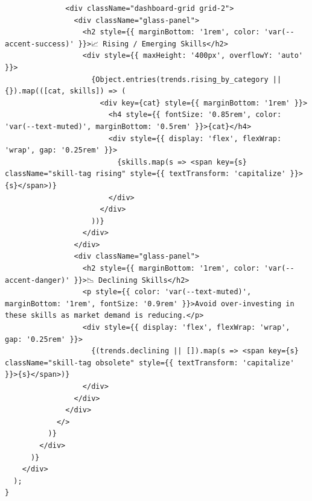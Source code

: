 \documentclass[12pt,a4paper]{report}
\begin{document}
\begin{verbatim}
              <div className="dashboard-grid grid-2">
                <div className="glass-panel">
                  <h2 style={{ marginBottom: '1rem', color: 'var(--accent-success)' }}>📈 Rising / Emerging Skills</h2>
                  <div style={{ maxHeight: '400px', overflowY: 'auto' }}>
                    {Object.entries(trends.rising_by_category || {}).map(([cat, skills]) => (
                      <div key={cat} style={{ marginBottom: '1rem' }}>
                        <h4 style={{ fontSize: '0.85rem', color: 'var(--text-muted)', marginBottom: '0.5rem' }}>{cat}</h4>
                        <div style={{ display: 'flex', flexWrap: 'wrap', gap: '0.25rem' }}>
                          {skills.map(s => <span key={s} className="skill-tag rising" style={{ textTransform: 'capitalize' }}>{s}</span>)}
                        </div>
                      </div>
                    ))}
                  </div>
                </div>
                <div className="glass-panel">
                  <h2 style={{ marginBottom: '1rem', color: 'var(--accent-danger)' }}>📉 Declining Skills</h2>
                  <p style={{ color: 'var(--text-muted)', marginBottom: '1rem', fontSize: '0.9rem' }}>Avoid over-investing in these skills as market demand is reducing.</p>
                  <div style={{ display: 'flex', flexWrap: 'wrap', gap: '0.25rem' }}>
                    {(trends.declining || []).map(s => <span key={s} className="skill-tag obsolete" style={{ textTransform: 'capitalize' }}>{s}</span>)}
                  </div>
                </div>
              </div>
            </>
          )}
        </div>
      )}
    </div>
  );
}

\end{verbatim}
\end{document}
